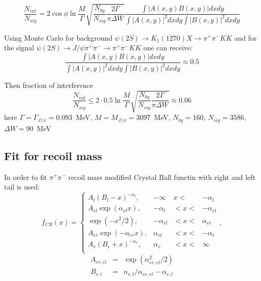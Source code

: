\documentclass[a4paper,12pt]{article}
\newcommand{\pipi}{\pi^{+}\pi^{-}}
\begin{document}
\begin{equation}
  \frac{N_{int}}{N_{sig}} = 2\cos\phi\ln\frac{M}{\Gamma} 
  \sqrt{\frac{N_{bg}}{N_{sig}}\frac{2 \Gamma}{\pi \Delta W}} 
  \frac{\int |A(x,y) B (x,y)|dxdy}{\int |A(x,y)|^2 dxdy\int |B(x,y)|^2 dxdy}
\end{equation}

Using Monte Carlo for background $\psi(2S) \to K_1(1270) X \to \pipi KK $ and for the signal $\psi(2S) \to J/\psi\pipi \to \pipi KK $ one can receive:
\begin{equation}
  \frac{\int |A(x,y) B (x,y)|dxdy}{\int |A(x,y)|^2 dxdy\int |B(x,y)|^2 dxdy} \approx 0.5
\end{equation}

Then fraction of interference
\begin{equation}
  \frac{N_{int}}{N_{sig}} \le 2 \cdot 0.5 \ln\frac{M}{\Gamma} 
    \sqrt{\frac{N_{bg}}{N_{sig}}\frac{2 \Gamma}{\pi \Delta W}}   \approx 0.06
\end{equation}
here $\Gamma = \Gamma_{J/\psi} = 0.093$~MeV, $M= M_{J/\psi}=3097$~MeV, $N_{bg}=160$, $N_{sig} = 3586$, $\Delta W = 90$~MeV 




\subsection{Fit for recoil mass}

In order to fit $\pi^+\pi^-$ recoil mass modified Crystal Ball \cite{CrystalBallFunc}functin with right and left tail is used:
\begin{equation}
	f_{CB}(x)  = 	\left\{
		\begin{array}{lrrr}
			A_l(B_l - x)^{-n_l},  & -\infty &   x <&   -\alpha_l \\
			A_{el}\exp(\alpha_{el}x), &  -\alpha_l & < x  < &-\alpha_{el} \\
			\exp( - x^2/2),  &  - \alpha_{el} & < x < & \alpha_{er} \\
			A_{er}\exp(-\alpha_{er}x), &  \alpha_{el} & < x < & -\alpha_{r} \\
			A_r(B_r + x)^{-n_r}, &   \alpha_r & < x < & \infty \\
		\end{array}
		\right., 
\end{equation}
\begin{equation}
	\begin{array}{lcl}
		A_{er, el} & = &  \exp(\alpha_{er, el}^2/2) \\
		B_{ r, l}  &  = & n_{r, l}/ \alpha_{er, el} - \alpha_{r, l}
	\end{array}
\end{equation}
\end{document}

